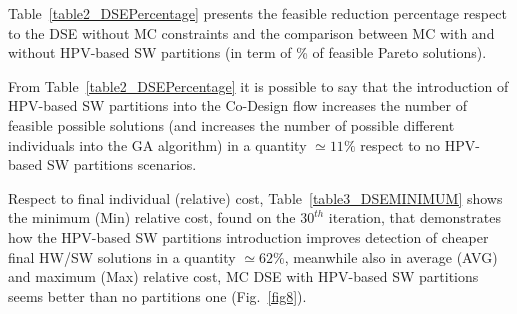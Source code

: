 %
Table~\ref{table2_DSEPercentage} presents the feasible reduction percentage respect to the DSE without MC constraints and the comparison between MC with and without HPV-based SW partitions (in term of \% of feasible Pareto solutions). \par
From Table~\ref{table2_DSEPercentage} it is possible to say that the introduction of HPV-based SW partitions into the Co-Design flow increases the number of feasible possible solutions (and increases the number of possible different individuals into the GA algorithm) in a quantity $\simeq 11 \%$ respect to no HPV-based SW partitions scenarios. \par 
%
\begin{table}[htbp]
\caption{DSE percentage reduction of feasible solutions.}
\begin{center}
\label{table2_DSEPercentage}
\end{center}
\end{table}
%
Respect to final individual (relative) cost, Table~\ref{table3_DSEMINIMUM} shows the minimum (Min) relative cost, found on the $30^{th}$ iteration, that demonstrates how the HPV-based SW partitions introduction improves detection of cheaper final HW/SW solutions in a quantity $\simeq62 \%$, meanwhile also in average (AVG) and maximum (Max) relative cost, MC DSE with HPV-based SW partitions seems better than no partitions one (Fig.~\ref{fig8}). \par
%
\begin{table}[htbp]
\caption{DSE minimum (relative) cost analysis}
\begin{center}
\label{table3_DSEMINIMUM}
\end{center}
\end{table}

